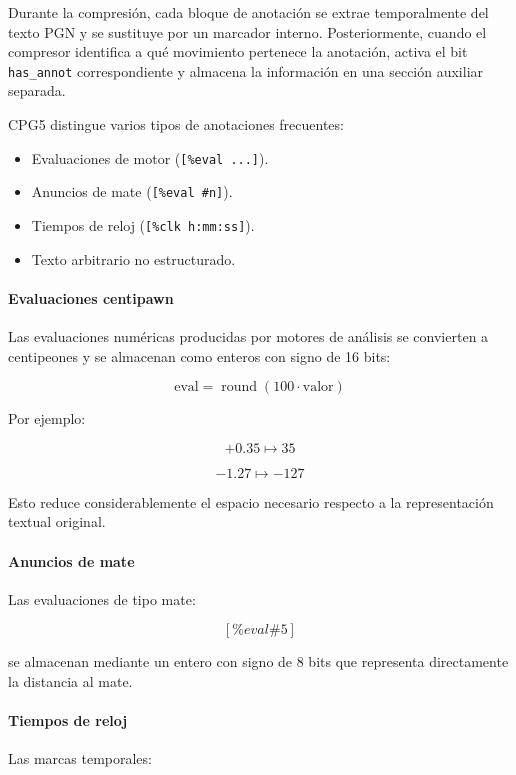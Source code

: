 \documentclass[11pt, letterpaper]{article}
\begin{document}
Durante la compresión, cada bloque de anotación se extrae temporalmente del texto PGN y se sustituye por un marcador interno. Posteriormente, cuando el compresor identifica a qué movimiento pertenece la anotación, activa el bit \texttt{has\_annot} correspondiente y almacena la información en una sección auxiliar separada.

CPG5 distingue varios tipos de anotaciones frecuentes:

\begin{itemize}
\item Evaluaciones de motor (\texttt{[\%eval ...]}).
\item Anuncios de mate (\texttt{[\%eval \#n]}).
\item Tiempos de reloj (\texttt{[\%clk h:mm:ss]}).
\item Texto arbitrario no estructurado.
\end{itemize}

\paragraph{Evaluaciones centipawn}

Las evaluaciones numéricas producidas por motores de análisis se convierten a centipeones y se almacenan como enteros con signo de 16 bits:

\[
\text{eval} = \operatorname{round}(100 \cdot \text{valor})
\]

Por ejemplo:

\[
+0.35 \mapsto 35
\]

\[
-1.27 \mapsto -127
\]

Esto reduce considerablemente el espacio necesario respecto a la representación textual original.

\paragraph{Anuncios de mate}

Las evaluaciones de tipo mate:

\[
    [\%eval \#5]
\]

se almacenan mediante un entero con signo de 8 bits que representa directamente la distancia al mate.

\paragraph{Tiempos de reloj}

Las marcas temporales:
\end{document}
